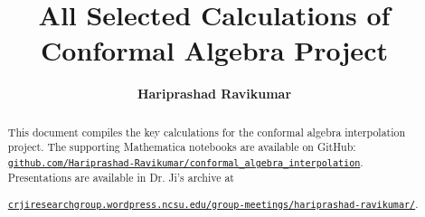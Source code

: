 \documentclass[]{article}
\title{All Selected Calculations of Conformal Algebra Project}
\author{\textbf{Hariprashad Ravikumar}}
\numberwithin{equation}{section}
\begin{document}
	\maketitle
\begin{abstract}
This document compiles the key calculations for the conformal algebra interpolation project. 
The supporting Mathematica notebooks are available on GitHub:
\href{https://github.com/Hariprashad-Ravikumar/conformal_algebra_interpolation}{\texttt{github.com/Hariprashad-Ravikumar/conformal\_algebra\_interpolation}}. Presentations are available in Dr. Ji's archive at\par \href{https://crjiresearchgroup.wordpress.ncsu.edu/group-meetings/hariprashad-ravikumar/}{\texttt{crjiresearchgroup.wordpress.ncsu.edu/group-meetings/hariprashad-ravikumar/}}.
\end{abstract}

\tableofcontents
\end{document}
